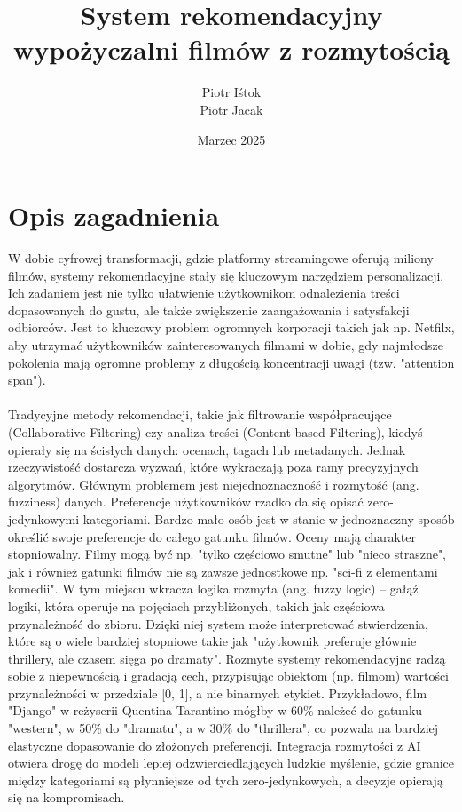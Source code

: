 \documentclass{article}
\title{System rekomendacyjny wypożyczalni filmów z rozmytością}
\author{Piotr Iśtok \\ Piotr Jacak}
\date{Marzec 2025}
\begin{document}
\maketitle


\tableofcontents
\newpage

\section{Opis zagadnienia}
W dobie cyfrowej transformacji, gdzie platformy streamingowe oferują miliony filmów, systemy rekomendacyjne stały się kluczowym narzędziem personalizacji. Ich zadaniem jest nie tylko ułatwienie użytkownikom odnalezienia treści dopasowanych do gustu, ale także zwiększenie zaangażowania i satysfakcji odbiorców. Jest to kluczowy problem ogromnych korporacji takich jak np. Netfilx, aby utrzymać użytkowników zainteresowanych filmami w dobie, gdy najmłodsze pokolenia mają ogromne problemy z długością koncentracji uwagi (tzw. "attention span"). \\ \\
Tradycyjne metody rekomendacji, takie jak filtrowanie współpracujące (Collaborative Filtering) czy analiza treści (Content-based Filtering), kiedyś opierały się na ścisłych danych: ocenach, tagach lub metadanych. Jednak rzeczywistość dostarcza wyzwań, które wykraczają poza ramy precyzyjnych algorytmów. Głównym problemem jest niejednoznaczność i rozmytość (ang. fuzziness) danych. Preferencje użytkowników rzadko da się opisać zero-jedynkowymi kategoriami. Bardzo mało osób jest w stanie w jednoznaczny sposób określić swoje preferencje do całego gatunku filmów. Oceny mają charakter stopniowalny. Filmy mogą być np. "tylko częściowo smutne" lub "nieco straszne", jak i również gatunki filmów nie są zawsze jednostkowe np. "sci-fi z elementami komedii". W tym miejscu wkracza logika rozmyta (ang. fuzzy logic) – gałąź logiki, która operuje na pojęciach przybliżonych, takich jak częściowa przynależność do zbioru. Dzięki niej system może interpretować stwierdzenia, które są o wiele bardziej stopniowe takie jak "użytkownik preferuje głównie thrillery, ale czasem sięga po dramaty". Rozmyte systemy rekomendacyjne radzą sobie z niepewnością i gradacją cech, przypisując obiektom (np. filmom) wartości przynależności w przedziale [0, 1], a nie binarnych etykiet. Przykładowo, film "Django" w reżyserii Quentina Tarantino mógłby w 60\% należeć do gatunku "western", w 50\% do "dramatu", a w 30\% do "thrillera", co pozwala na bardziej elastyczne dopasowanie do złożonych preferencji. Integracja rozmytości z AI otwiera drogę do modeli lepiej odzwierciedlających ludzkie myślenie, gdzie granice między kategoriami są płynniejsze od tych zero-jedynkowych, a decyzje opierają się na kompromisach.
\end{document}
